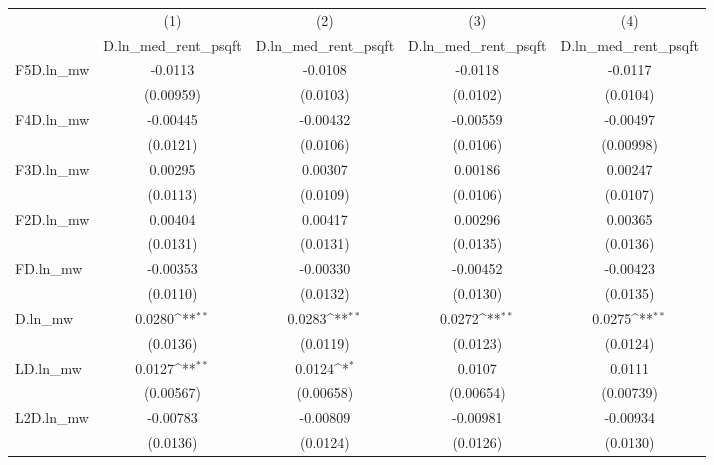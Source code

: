 {
\def\sym#1{\ifmmode^{#1}\else\(^{#1}\)\fi}
\begin{tabular}{l*{4}{c}}
\hline\hline
          &\multicolumn{1}{c}{(1)}&\multicolumn{1}{c}{(2)}&\multicolumn{1}{c}{(3)}&\multicolumn{1}{c}{(4)}\\
          &\multicolumn{1}{c}{D.ln\_med\_rent\_psqft}&\multicolumn{1}{c}{D.ln\_med\_rent\_psqft}&\multicolumn{1}{c}{D.ln\_med\_rent\_psqft}&\multicolumn{1}{c}{D.ln\_med\_rent\_psqft}\\
\hline
F5D.ln\_mw &  -0.0113         &  -0.0108         &  -0.0118         &  -0.0117         \\
          &(0.00959)         & (0.0103)         & (0.0102)         & (0.0104)         \\
[1em]
F4D.ln\_mw & -0.00445         & -0.00432         & -0.00559         & -0.00497         \\
          & (0.0121)         & (0.0106)         & (0.0106)         &(0.00998)         \\
[1em]
F3D.ln\_mw &  0.00295         &  0.00307         &  0.00186         &  0.00247         \\
          & (0.0113)         & (0.0109)         & (0.0106)         & (0.0107)         \\
[1em]
F2D.ln\_mw &  0.00404         &  0.00417         &  0.00296         &  0.00365         \\
          & (0.0131)         & (0.0131)         & (0.0135)         & (0.0136)         \\
[1em]
FD.ln\_mw  & -0.00353         & -0.00330         & -0.00452         & -0.00423         \\
          & (0.0110)         & (0.0132)         & (0.0130)         & (0.0135)         \\
[1em]
D.ln\_mw   &   0.0280\sym{**} &   0.0283\sym{**} &   0.0272\sym{**} &   0.0275\sym{**} \\
          & (0.0136)         & (0.0119)         & (0.0123)         & (0.0124)         \\
[1em]
LD.ln\_mw  &   0.0127\sym{**} &   0.0124\sym{*}  &   0.0107         &   0.0111         \\
          &(0.00567)         &(0.00658)         &(0.00654)         &(0.00739)         \\
[1em]
L2D.ln\_mw & -0.00783         & -0.00809         & -0.00981         & -0.00934         \\
          & (0.0136)         & (0.0124)         & (0.0126)         & (0.0130)         \\

\end{tabular}}
